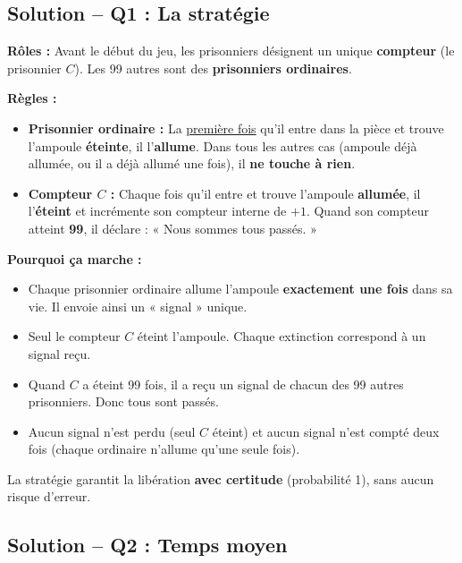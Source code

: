 \subsection*{Solution -- Q1 : La stratégie}

\textbf{Rôles :} Avant le début du jeu, les prisonniers désignent un unique \textbf{compteur} (le prisonnier $C$). Les 99 autres sont des \textbf{prisonniers ordinaires}.

\bigskip

\textbf{Règles :}

\begin{itemize}
    \item \textbf{Prisonnier ordinaire :} La \underline{première fois} qu'il entre dans la pièce et trouve l'ampoule \textbf{éteinte}, il l'\textbf{allume}. Dans tous les autres cas (ampoule déjà allumée, ou il a déjà allumé une fois), il \textbf{ne touche à rien}.

    \item \textbf{Compteur $C$ :} Chaque fois qu'il entre et trouve l'ampoule \textbf{allumée}, il l'\textbf{éteint} et incrémente son compteur interne de $+1$. Quand son compteur atteint \textbf{99}, il déclare : « Nous sommes tous passés. »
\end{itemize}

\bigskip

\textbf{Pourquoi ça marche :}

\begin{itemize}
    \item Chaque prisonnier ordinaire allume l'ampoule \textbf{exactement une fois} dans sa vie. Il envoie ainsi un « signal » unique.
    \item Seul le compteur $C$ éteint l'ampoule. Chaque extinction correspond à un signal reçu.
    \item Quand $C$ a éteint 99 fois, il a reçu un signal de chacun des 99 autres prisonniers. Donc tous sont passés.
    \item Aucun signal n'est perdu (seul $C$ éteint) et aucun signal n'est compté deux fois (chaque ordinaire n'allume qu'une seule fois).
\end{itemize}

La stratégie garantit la libération \textbf{avec certitude} (probabilité 1), sans aucun risque d'erreur.

\bigskip

\subsection*{Solution -- Q2 : Temps moyen}

